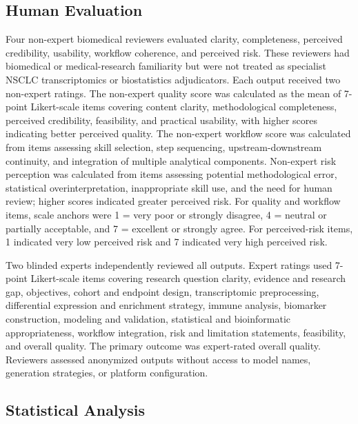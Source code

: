 \documentclass[11pt]{article}
\begin{document}
\subsection{Human Evaluation}

Four non-expert biomedical reviewers evaluated clarity, completeness, perceived credibility, usability, workflow coherence, and perceived risk. These reviewers had biomedical or medical-research familiarity but were not treated as specialist NSCLC transcriptomics or biostatistics adjudicators. Each output received two non-expert ratings. The non-expert quality score was calculated as the mean of 7-point Likert-scale items covering content clarity, methodological completeness, perceived credibility, feasibility, and practical usability, with higher scores indicating better perceived quality. The non-expert workflow score was calculated from items assessing skill selection, step sequencing, upstream-downstream continuity, and integration of multiple analytical components. Non-expert risk perception was calculated from items assessing potential methodological error, statistical overinterpretation, inappropriate skill use, and the need for human review; higher scores indicated greater perceived risk. For quality and workflow items, scale anchors were 1 = very poor or strongly disagree, 4 = neutral or partially acceptable, and 7 = excellent or strongly agree. For perceived-risk items, 1 indicated very low perceived risk and 7 indicated very high perceived risk.

Two blinded experts independently reviewed all outputs. Expert ratings used 7-point Likert-scale items covering research question clarity, evidence and research gap, objectives, cohort and endpoint design, transcriptomic preprocessing, differential expression and enrichment strategy, immune analysis, biomarker construction, modeling and validation, statistical and bioinformatic appropriateness, workflow integration, risk and limitation statements, feasibility, and overall quality. The primary outcome was expert-rated overall quality. Reviewers assessed anonymized outputs without access to model names, generation strategies, or platform configuration.

\subsection{Statistical Analysis}
\end{document}
